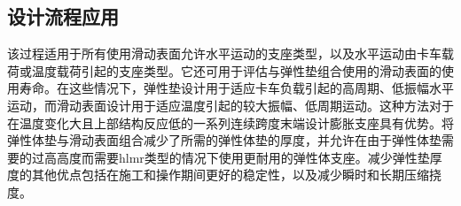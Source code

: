 \subsection{设计流程应用}
该过程适用于所有使用滑动表面允许水平运动的支座类型，以及水平运动由卡车载荷或温度载荷引起的支座类型。它还可用于评估与弹性垫组合使用的滑动表面的使用寿命。在这些情况下，弹性垫设计用于适应卡车负载引起的高周期、低振幅水平运动，而滑动表面设计用于适应温度引起的较大振幅、低周期运动。这种方法对于在温度变化大且上部结构反应低的一系列连续跨度末端设计膨胀支座具有优势。将弹性体垫与滑动表面组合减少了所需的弹性体垫的厚度，并允许在由于弹性体垫需要的过高高度而需要\acrlong{hlmr}类型的情况下使用更耐用的弹性体支座。减少弹性垫厚度的其他优点包括在施工和操作期间更好的稳定性，以及减少瞬时和长期压缩挠度。